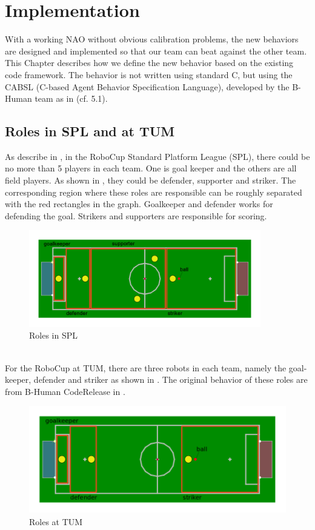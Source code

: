 \chapter{Implementation}\label{Chap:Imp}
With a working NAO without obvious calibration problems, the new behaviors are designed and implemented so that our team can beat against the other team. This Chapter describes how we define the new behavior based on the existing code framework. The behavior is not written using standard C, but using the CABSL (C-based Agent Behavior Specification Language), developed by the B-Human team as in \cite{BHumanCodeRelease2013}(cf. 5.1).
\clearpage
\section{Roles in SPL and at TUM}
As describe in \cite{Rules}, in the RoboCup Standard Platform League (SPL), there could be no more than 5 players in each team. One is goal keeper and the others are all field players. As shown in , they could be defender, supporter and striker. The corresponding region where these roles are responsible can be roughly separated with the red rectangles in the graph. Goalkeeper and defender works for defending the goal. Strikers and supporters are responsible for scoring.
\begin{figure}[!htb]
    \includegraphics[width=0.9\textwidth]{pics/SPL}
    \centering
    \caption{Roles in SPL}
    \label{fig: SPL}
\end{figure}\\
For the RoboCup at TUM, there are three robots in each team, namely the goal-keeper, defender and striker as shown in . The original behavior of these roles are from B-Human CodeRelease in \cite{BHumanCodeRelease2015}.
\begin{figure}[!htb]
    \centering
    \includegraphics[width=\textwidth]{pics/TUM}
    \caption{Roles at TUM}
    \label{fig: TUM}
\end{figure}

